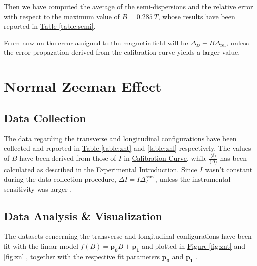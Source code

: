 \documentclass[a4paper,12pt,abstracton]{scrartcl}
\begin{document}
Then we have computed the average of the semi-dispersions and the relative error with respect to the maximum value of $B=0.285\;T$, whose results have been reported in \hyperref[table:semi]{ Table \ref*{table:semi}}.

\begin{table}[H]
\centering
\caption{}
\label{table:semi}
\end{table}

From now on the error assigned to the magnetic field will be $\Delta_B=B\Delta_{\text{rel}}$, unless the error propagation derived from the calibration curve yields a larger value. 

\clearpage

\section{Normal Zeeman Effect}\label{sec: NZ}

\subsection{Data Collection}

The data regarding the transverse and longitudinal configurations have been collected and reported in \hyperref[table:znt]{Table \ref*{table:znt}} and \hyperref[table:znl]{ \ref*{table:znl}} respectively. The values of $B$ have been derived from those of $I$ in \hyperref[sec:cal]{Calibration Curve}, while $\frac{\langle \delta \rangle}{\langle \Delta \rangle}$ has been calculated as described in the \hyperref[sec: ExpIntro]{Experimental Introduction}. Since $I$ wasn't constant during the data collection procedure, $\Delta I=I\Delta_I^{\text{semi}}$, unless the instrumental sensitivity was larger .

\subsection{Data Analysis \& Visualization}

The datasets concerning the transverse and longitudinal configurations have been fit with the linear model $f(B)=\boldsymbol{p_0}B+\boldsymbol{p_1}$ and plotted in \hyperref[fig:znt]{Figure \ref*{fig:znt}} and \hyperref[fig:znl]{ \ref*{fig:znl}}, together with the respective fit parameters $\boldsymbol{p_0}$ and  $\boldsymbol{p_1}$ .
\end{document}
